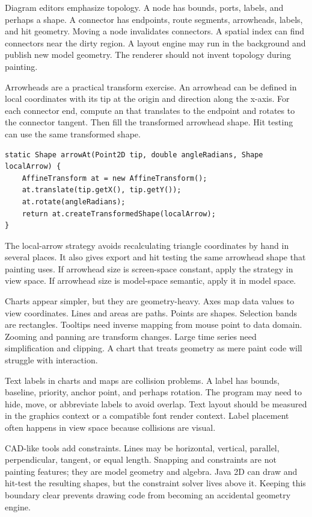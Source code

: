 Diagram editors emphasize topology. A node has bounds, ports, labels, and perhaps a shape. A connector has endpoints, route segments, arrowheads, labels, and hit geometry. Moving a node invalidates connectors. A spatial index can find connectors near the dirty region. A layout engine may run in the background and publish new model geometry. The renderer should not invent topology during painting.

Arrowheads are a practical transform exercise. An arrowhead can be defined in local coordinates with its tip at the origin and direction along the x-axis. For each connector end, compute an  that translates to the endpoint and rotates to the connector tangent. Then fill the transformed arrowhead shape. Hit testing can use the same transformed shape.

\begin{lstlisting}[caption={Transforming a local arrowhead shape to a connector endpoint.}]
static Shape arrowAt(Point2D tip, double angleRadians, Shape localArrow) {
    AffineTransform at = new AffineTransform();
    at.translate(tip.getX(), tip.getY());
    at.rotate(angleRadians);
    return at.createTransformedShape(localArrow);
}
\end{lstlisting}

The local-arrow strategy avoids recalculating triangle coordinates by hand in several places. It also gives export and hit testing the same arrowhead shape that painting uses. If arrowhead size is screen-space constant, apply the strategy in view space. If arrowhead size is model-space semantic, apply it in model space.

Charts appear simpler, but they are geometry-heavy. Axes map data values to view coordinates. Lines and areas are paths. Points are shapes. Selection bands are rectangles. Tooltips need inverse mapping from mouse point to data domain. Zooming and panning are transform changes. Large time series need simplification and clipping. A chart that treats geometry as mere paint code will struggle with interaction.

Text labels in charts and maps are collision problems. A label has bounds, baseline, priority, anchor point, and perhaps rotation. The program may need to hide, move, or abbreviate labels to avoid overlap. Text layout should be measured in the graphics context or a compatible font render context. Label placement often happens in view space because collisions are visual.

CAD-like tools add constraints. Lines may be horizontal, vertical, parallel, perpendicular, tangent, or equal length. Snapping and constraints are not painting features; they are model geometry and algebra. Java 2D can draw and hit-test the resulting shapes, but the constraint solver lives above it. Keeping this boundary clear prevents drawing code from becoming an accidental geometry engine.

